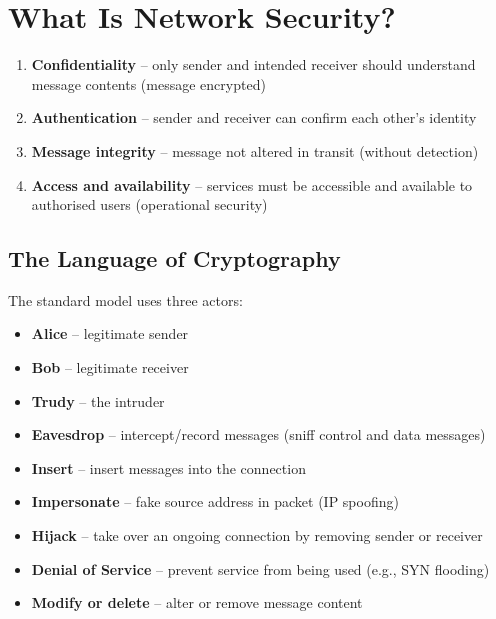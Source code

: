 \section{What Is Network Security?}

\begin{tcolorbox}[keybox, title=Four Desirable Properties of Secure Communication]
\begin{enumerate}[noitemsep]
  \item \textbf{Confidentiality} -- only sender and intended receiver should understand message contents (message encrypted)
  \item \textbf{Authentication} -- sender and receiver can confirm each other's identity
  \item \textbf{Message integrity} -- message not altered in transit (without detection)
  \item \textbf{Access and availability} -- services must be accessible and available to authorised users (operational security)
\end{enumerate}
\end{tcolorbox}

\subsection{The Language of Cryptography}

The standard model uses three actors:
\begin{itemize}[noitemsep]
  \item \textbf{Alice} -- legitimate sender
  \item \textbf{Bob} -- legitimate receiver
  \item \textbf{Trudy} -- the intruder
\end{itemize}

\begin{tcolorbox}[warnbox, title=What Trudy Can Do]
\begin{itemize}[noitemsep]
  \item \textbf{Eavesdrop} -- intercept/record messages (sniff control and data messages)
  \item \textbf{Insert} -- insert messages into the connection
  \item \textbf{Impersonate} -- fake source address in packet (IP spoofing)
  \item \textbf{Hijack} -- take over an ongoing connection by removing sender or receiver
  \item \textbf{Denial of Service} -- prevent service from being used (e.g., SYN flooding)
  \item \textbf{Modify or delete} -- alter or remove message content
\end{itemize}
\end{tcolorbox}

